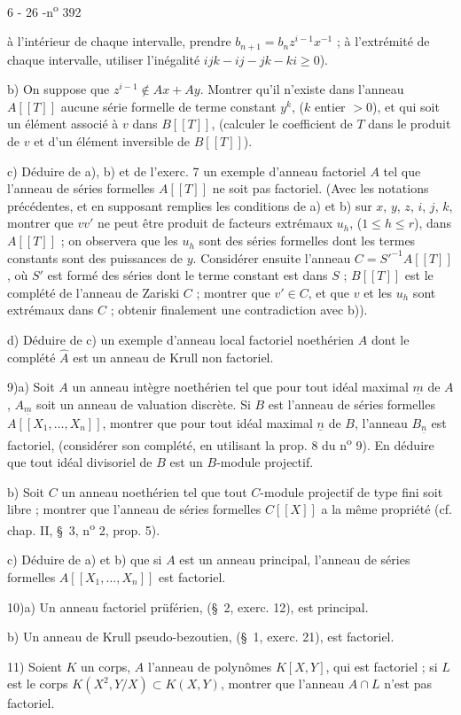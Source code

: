 \begin{center}6 - 26 -\hfill n\textsuperscript{o} 392\end{center}

à l'intérieur de chaque intervalle, prendre $b_{n+1}=b_nz^{i-1}x^{-1}$ ; à l'extrémité de chaque intervalle, utiliser l'inégalité $ijk-ij-jk-ki\geq 0$).

b) On suppose que $z^{i-1}\notin Ax+Ay$. Montrer qu'il n'existe dans l'anneau $A[[T]]$ aucune série formelle de terme constant $y^k$, ($k$ entier $>0$), et qui soit un élément associé à $v$ dans $B[[T]]$, (calculer le coefficient de $T$ dans le produit de $v$ et d'un élément inversible de $B[[T]]$).

c) Déduire de a), b) et de l'exerc. 7 un exemple d'anneau factoriel $A$ tel que l'anneau de séries formelles $A[[T]]$ ne soit pas factoriel. (Avec les notations précédentes, et en supposant remplies les conditions de a) et b) sur $x$, $y$, $z$, $i$, $j$, $k$, montrer que $vv'$ ne peut être produit de facteurs extrémaux $u_h$, ($1\leq h\leq r$), dans $A[[T]]$ ; on observera que les $u_h$ sont des séries formelles dont les termes constants sont des puissances de $y$. Considérer ensuite l'anneau $C=S'^{-1}A[[T]]$, où $S'$ est formé des séries dont le terme constant est dans $S$ ; $B[[T]]$ est le complété de l'anneau de Zariski $C$ ; montrer que $v'\in C$, et que $v$ et les $u_h$ sont extrémaux dans $C$ ; obtenir finalement une contradiction avec b)).

d) Déduire de c) un exemple d'anneau local factoriel noethérien $A$ dont le complété $\widehat{A}$ est un anneau de Krull non factoriel.

9)\quad a) Soit $A$ un anneau intègre noethérien tel que pour tout idéal maximal $\underline{m}$ de $A$, $A_{\underline{m}}$ soit un anneau de valuation discrète. Si $B$ est l'anneau de séries formelles $A[[X_1,\ldots,X_n]]$, montrer que pour tout idéal maximal $\underline{n}$ de $B$, l'anneau $B_{\underline{n}}$ est factoriel, (considérer son complété, en utilisant la prop. 8 du n\textsuperscript{o} 9). En déduire que tout idéal divisoriel de $B$ est un $B$-module projectif.

b) Soit $C$ un anneau noethérien tel que tout $C$-module projectif de type fini soit libre ; montrer que l'anneau de séries formelles $C[[X]]$ a la même propriété (cf. chap. II, \S\ 3, n\textsuperscript{o} 2, prop. 5).

c) Déduire de a) et b) que si $A$ est un anneau principal, l'anneau de séries formelles $A[[X_1,\ldots,X_n]]$ est factoriel.

10)\quad a) Un anneau factoriel prüférien, (\S\ 2, exerc. 12), est principal.

b) Un anneau de Krull pseudo-bezoutien, (\S\ 1, exerc. 21), est factoriel.

11) Soient $K$ un corps, $A$ l'anneau de polynômes $K[X,Y]$, qui est factoriel ; si $L$ est le corps $K(X^2,Y/X)\subset K(X,Y)$, montrer que l'anneau $A\cap L$ n'est pas factoriel.



